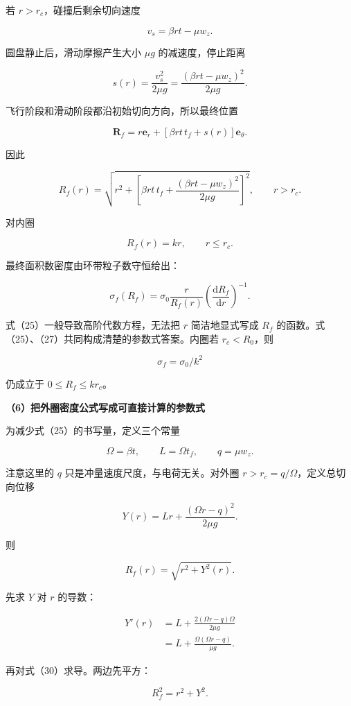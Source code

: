 \documentclass[12pt,a4paper,UTF8]{ctexart}
\begin{document}
若 \(r>r_c\)，碰撞后剩余切向速度

\[
v_s=\beta rt-\mu w_z.
\tag{22}
\]

圆盘静止后，滑动摩擦产生大小 \(\mu g\) 的减速度，停止距离

\[
s(r)=\frac{v_s^2}{2\mu g}
=\frac{(\beta rt-\mu w_z)^2}{2\mu g}.
\tag{23}
\]

飞行阶段和滑动阶段都沿初始切向方向，所以最终位置

\[
\bm R_f
=r\bm e_r+
\left[\beta rt\,t_f+s(r)\right]\bm e_\theta.
\tag{24}
\]

因此

\[
\boxed{
R_f(r)
=\sqrt{
r^2+
\left[
\beta rt\,t_f+
\frac{(\beta rt-\mu w_z)^2}{2\mu g}
\right]^2
}
},
\qquad r>r_c.
\tag{25}
\]

对内圈

\[
R_f(r)=kr,
\qquad r\leq r_c.
\tag{26}
\]

最终面积数密度由环带粒子数守恒给出：

\[
\boxed{
\sigma_f(R_f)
=\sigma_0
\frac{r}{R_f(r)}
\left(\frac{\mathrm dR_f}{\mathrm dr}\right)^{-1}
}.
\tag{27}
\]

式（25）一般导致高阶代数方程，无法把 \(r\) 简洁地显式写成 \(R_f\)
的函数。式（25）、（27）共同构成清楚的参数式答案。内圈若 \(r_c<R_0\)，则

\[
\boxed{\sigma_f=\sigma_0/k^2}
\]

仍成立于 \(0\leq R_f\leq kr_c\)。

\textbf{（6）把外圈密度公式写成可直接计算的参数式}

为减少式（25）的书写量，定义三个常量

\[
\Omega=\beta t,
\qquad
L=\Omega t_f,
\qquad
q=\mu w_z.
\tag{28}
\]

注意这里的 \(q\) 只是冲量速度尺度，与电荷无关。对外圈
\(r>r_c=q/\Omega\)，定义总切向位移

\[
Y(r)=Lr+\frac{(\Omega r-q)^2}{2\mu g}.
\tag{29}
\]

则

\[
R_f(r)=\sqrt{r^2+Y^2(r)}.
\tag{30}
\]

先求 \(Y\) 对 \(r\) 的导数：

\[
\begin{aligned}
Y'(r)
&=L+\frac{2(\Omega r-q)\Omega}{2\mu g}\\
&=L+\frac{\Omega(\Omega r-q)}{\mu g}.
\end{aligned}
\tag{31}
\]

再对式（30）求导。两边先平方：

\[
R_f^2=r^2+Y^2.
\]
\end{document}
